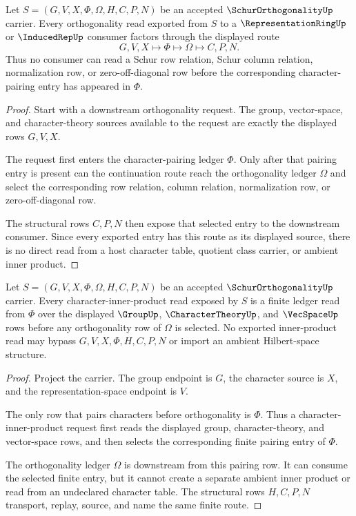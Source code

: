 \begin{theorem}
\label{thm:schur-orthogonality-character-pairing-route}
Let $S=(G,V,X,\Phi,\Omega,H,C,P,N)$ be an accepted $\SchurOrthogonalityUp$ carrier. Every orthogonality read exported from $S$ to a $\RepresentationRingUp$ or $\InducedRepUp$ consumer factors through the displayed route
$$
G,V,X \longmapsto \Phi \longmapsto \Omega \longmapsto C,P,N .
$$
Thus no consumer can read a Schur row relation, Schur column relation, normalization row, or zero-off-diagonal row before the corresponding character-pairing entry has appeared in $\Phi$.
\end{theorem}
\begin{proof}
Start with a downstream orthogonality request. The group, vector-space, and character-theory sources available to the request are exactly the displayed rows $G,V,X$.

The request first enters the character-pairing ledger $\Phi$. Only after that pairing entry is present can the continuation route reach the orthogonality ledger $\Omega$ and select the corresponding row relation, column relation, normalization row, or zero-off-diagonal row.

The structural rows $C,P,N$ then expose that selected entry to the downstream consumer. Since every exported entry has this route as its displayed source, there is no direct read from a host character table, quotient class carrier, or ambient inner product.
\end{proof}

\begin{theorem}
\label{thm:schurorthogonality-character-inner-product}
Let $S=(G,V,X,\Phi,\Omega,H,C,P,N)$ be an accepted $\SchurOrthogonalityUp$ carrier. Every character-inner-product read exposed by $S$ is a finite ledger read from $\Phi$ over the displayed $\GroupUp$, $\CharacterTheoryUp$, and $\VecSpaceUp$ rows before any orthogonality row of $\Omega$ is selected. No exported inner-product read may bypass $G,V,X,\Phi,H,C,P,N$ or import an ambient Hilbert-space structure.
\end{theorem}
\begin{proof}
Project the carrier. The group endpoint is $G$, the character source is $X$, and the representation-space endpoint is $V$.

The only row that pairs characters before orthogonality is $\Phi$. Thus a character-inner-product request first reads the displayed group, character-theory, and vector-space rows, and then selects the corresponding finite pairing entry of $\Phi$.

The orthogonality ledger $\Omega$ is downstream from this pairing row. It can consume the selected finite entry, but it cannot create a separate ambient inner product or read from an undeclared character table. The structural rows $H,C,P,N$ transport, replay, source, and name the same finite route.
\end{proof}

